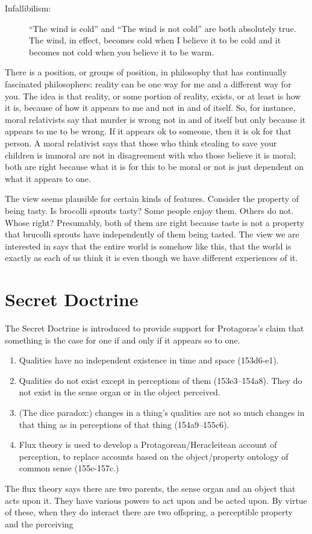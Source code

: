\documentclass[oneside]{article}
\begin{document}
\begin{description}
\item[ Infallibilism:] ``The wind is cold'' and ``The wind is not cold'' are both absolutely true. The wind, in effect, becomes cold when I believe it to be cold and it becomes not cold when you believe it to be warm. 
\end{description}

There is a position, or groups of position, in philosophy that has continually fascinated philosophers: reality can be one way for me and a different way for you. The idea is that reality, or some portion of reality, exists, or at least is how it is, because of how it appears to me and not in and of itself. So, for instance, moral relativists say that murder is wrong not in and of itself but only because it appears to me to be wrong. If it appears ok to someone, then it is ok for that person. A moral relativist says that those who think stealing to save your children is immoral are not in disagreement with who those believe it is moral; both are right because what it is for this to be moral or not is just dependent on what it appears to one. 

The view seems plausible for certain kinds of features. Consider the property of being tasty. Is brocolli sprouts tasty? Some people enjoy them. Others do not. Whose right? Presumably, both of them are right because taste is not a property that brucolli sprouts have independently of them being tasted. The view we are interested in says that the entire world is somehow like this, that the world is exactly as each of us think it is even though we have different experiences of it. 


\section*{Secret Doctrine}

The Secret Doctrine is introduced to provide support for Protagoras's claim that something is the case for one if and only if it appears so to one.
\begin{enumerate}
\item Qualities have no independent existence in time and space (153d6-e1).
\item Qualities do not exist except in perceptions of them (153e3–154a8). They do not exist in the sense organ or in the object perceived. 
\item (The dice paradox:) changes in a thing's qualities are not so much changes in that thing as in perceptions of that thing (154a9–155c6).
\item  Flux theory is used to develop a Protagorean/Heracleitean account of perception, to replace accounts based on the object/property ontology of common sense (155c-157c.) 
\end{enumerate}
The flux theory says there are two parents, the sense organ and an object that acts upon it. They have various powers to act upon and be acted upon. By virtue of these, when they do interact there are two offspring, a perceptible property and the perceiving
\end{document}
